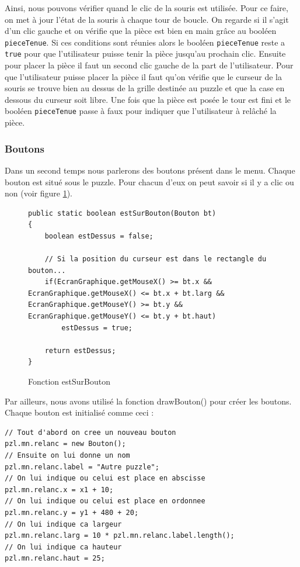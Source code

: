 \documentclass[]{article}
\newcommand{\variable}[1]{\noindent \texttt{#1}}
\begin{document}
Ainsi, nous pouvons vérifier quand le clic de la souris est utilisée. 
Pour ce faire, on met à jour l'état de la souris à chaque tour de boucle. On regarde si il s'agit d'un clic gauche et on vérifie que la pièce est bien en main grâce au booléen \variable{pieceTenue}. Si ces conditions sont réunies alors le booléen \variable{pieceTenue} reste a \variable{true} pour que l'utilisateur puisse tenir la pièce jusqu'au prochain clic. Ensuite pour placer la pièce il faut un second clic gauche de la part de  l'utilisateur.
Pour que l'utilisateur puisse placer la pièce il faut qu'on vérifie que le curseur de la souris se trouve bien au dessus de la grille destinée au puzzle et que la case en dessous du curseur soit libre. Une fois que la pièce est posée le tour est fini et le booléen \variable{pieceTenue} passe à faux pour indiquer que l'utilisateur à relâché la pièce.

\subsubsection{Boutons}
Dans un second temps nous parlerons des boutons présent dans le menu. 
Chaque bouton est situé sous le puzzle.  Pour chacun d'eux on peut savoir si il y a clic ou non (voir figure \no\ref{Fonction estSurBouton}).

\begin{figure}[hpt]
	\center
	\caption{\label{Fonction estSurBouton} Fonction estSurBouton}
\begin{lstlisting}
public static boolean estSurBouton(Bouton bt)
{
    boolean estDessus = false;

    // Si la position du curseur est dans le rectangle du bouton...
    if(EcranGraphique.getMouseX() >= bt.x && EcranGraphique.getMouseX() <= bt.x + bt.larg && EcranGraphique.getMouseY() >= bt.y && EcranGraphique.getMouseY() <= bt.y + bt.haut)
        estDessus = true;

    return estDessus;
}
\end{lstlisting}
\end{figure}

Par ailleurs, nous avons utilisé la fonction drawBouton() pour créer les boutons. Chaque bouton est initialisé comme ceci :

\begin{lstlisting}
// Tout d'abord on cree un nouveau bouton
pzl.mn.relanc = new Bouton(); 
// Ensuite on lui donne un nom 
pzl.mn.relanc.label = "Autre puzzle";
// On lui indique ou celui est place en abscisse 
pzl.mn.relanc.x = x1 + 10;
// On lui indique ou celui est place en ordonnee
pzl.mn.relanc.y = y1 + 480 + 20;
// On lui indique ca largeur
pzl.mn.relanc.larg = 10 * pzl.mn.relanc.label.length();
// On lui indique ca hauteur
pzl.mn.relanc.haut = 25;
\end{lstlisting}
\end{document}
